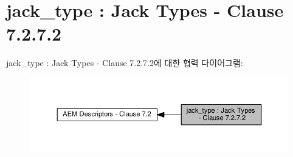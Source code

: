 \hypertarget{group__jack__type}{}\section{jack\+\_\+type \+: Jack Types -\/ Clause 7.2.7.2}
\label{group__jack__type}
jack\+\_\+type \+: Jack Types -\/ Clause 7.2.7.2에 대한 협력 다이어그램\+:
\nopagebreak
\begin{figure}[H]
\begin{center}
\leavevmode
\includegraphics[width=350pt]{group__jack__type}
\end{center}
\end{figure}
